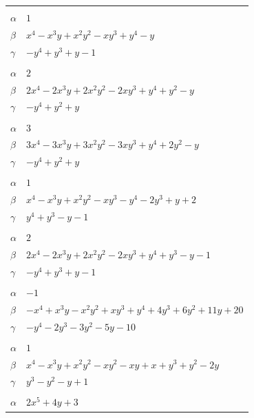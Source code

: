 \documentclass[11pt]{article}
\begin{document}
\begin{longtable}{@{}ll@{}}
\addlinespace[3pt]
\multicolumn{2}{@{}l}{$\{i,j\}=\{3,4\}$, $k_{ij}=5$}\\
$\alpha$ & $1$\\
$\beta$ & $x^{4}-x^{3}y+x^{2}y^{2}-xy^{3}+y^{4}-y$\\
$\gamma$ & $-y^{4}+y^{3}+y-1$\\
\addlinespace[3pt]
\multicolumn{2}{@{}l}{$\{i,j\}=\{3,6\}$, $k_{ij}=2^{3}$}\\
$\alpha$ & $2$\\
$\beta$ & $2x^{4}-2x^{3}y+2x^{2}y^{2}-2xy^{3}+y^{4}+y^{2}-y$\\
$\gamma$ & $-y^{4}+y^{2}+y$\\
\addlinespace[3pt]
\multicolumn{2}{@{}l}{$\{i,j\}=\{3,12\}$, $k_{ij}=2^{2}\cdot 3$}\\
$\alpha$ & $3$\\
$\beta$ & $3x^{4}-3x^{3}y+3x^{2}y^{2}-3xy^{3}+y^{4}+2y^{2}-y$\\
$\gamma$ & $-y^{4}+y^{2}+y$\\
\addlinespace[3pt]
\multicolumn{2}{@{}l}{$\{i,j\}=\{3,13\}$, $k_{ij}=5$}\\
$\alpha$ & $1$\\
$\beta$ & $x^{4}-x^{3}y+x^{2}y^{2}-xy^{3}-y^{4}-2y^{3}+y+2$\\
$\gamma$ & $y^{4}+y^{3}-y-1$\\
\addlinespace[3pt]
\multicolumn{2}{@{}l}{$\{i,j\}=\{3,16\}$, $k_{ij}=2\cdot 5$}\\
$\alpha$ & $2$\\
$\beta$ & $2x^{4}-2x^{3}y+2x^{2}y^{2}-2xy^{3}+y^{4}+y^{3}-y-1$\\
$\gamma$ & $-y^{4}+y^{3}+y-1$\\
\addlinespace[3pt]
\multicolumn{2}{@{}l}{$\{i,j\}=\{3,17\}$, $k_{ij}=2^{4}$}\\
$\alpha$ & $-1$\\
$\beta$ & $-x^{4}+x^{3}y-x^{2}y^{2}+xy^{3}+y^{4}+4y^{3}+6y^{2}+11y+20$\\
$\gamma$ & $-y^{4}-2y^{3}-3y^{2}-5y-10$\\
\addlinespace[3pt]
\multicolumn{2}{@{}l}{$\{i,j\}=\{3,21\}$, $k_{ij}=5$}\\
$\alpha$ & $1$\\
$\beta$ & $x^{4}-x^{3}y+x^{2}y^{2}-xy^{2}-xy+x+y^{3}+y^{2}-2y$\\
$\gamma$ & $y^{3}-y^{2}-y+1$\\
\addlinespace[3pt]
\multicolumn{2}{@{}l}{$\{i,j\}=\{3,23\}$, $k_{ij}=3$}\\
$\alpha$ & $2x^{5}+4y+3$\\

\end{longtable}
\end{document}
